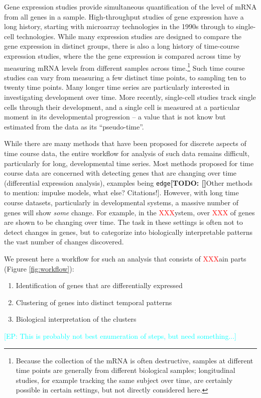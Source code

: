 \documentclass[11 pts]{article}
\makeatletter
\newcommand{\todo}[1]{\textbf{[TODO\@: #1]}}
\newcommand{\ep}[1]{\textcolor{cyan}{[EP\@: #1]}}
\newcommand{\xxx}[1]{\textcolor{red}{XXX}}
\makeatother
\begin{document}
Gene expression studies provide simultaneous quantification of the level of mRNA from all genes in a sample. High-throughput studies of gene expression have a long history, starting with microarray technologies in the 1990s through to single-cell technologies. While many expression studies are designed to compare the gene expression in distinct groups, there is also a long history of time-course expression studies, where the the gene expression is compared across time by measuring mRNA levels from different samples across time.\footnote{Because the collection of the mRNA is often destructive, samples at different time points are generally from different biological samples; longitudinal studies, for example tracking the same subject over time, are certainly possible in certain settings, but not directly considered here.} Such time course studies can vary from measuring a few distinct time points, to sampling ten to twenty time points. Many longer time series are particularly interested in investigating development over time. More recently, single-cell studies track single cells through their development, and a single cell is measured at a particular moment in its developmental progression -- a value that is not know but estimated from the data as its ``pseudo-time''.

While there are many methods that have been proposed for discrete aspects of time course data, the entire workflow for analysis of such data remains difficult, particularly for long, developmental time series. Most methods proposed for time course data are concerned with detecting genes that are changing over time (differential expression analysis), examples being \texttt{edge}\todo[Other methods to mention: impulse models, what else? Citations!]. However, with long time course datasets, particularly in developmental systems, a massive number of genes will show \emph{some} change. For example, in the \xxx system, over \xxx\% of genes are shown to be changing over time. The task in these settings is often not to detect changes in genes, but to categorize into biologically interpretable patterns the vast number of changes discovered. 

We present here a workflow for such an analysis that consists of \xxx main parts (Figure \ref{fig:workflow}):
\begin{enumerate}
	\item Identification of genes that are differentially expressed
	\item Clustering of genes into distinct temporal patterns
	\item Biological interpretation of the clusters
\end{enumerate}
\ep{This is probably not best enumeration of steps, but need something...}
\end{document}
